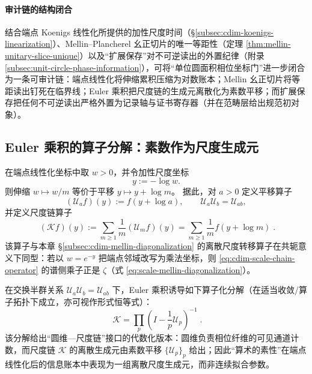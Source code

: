 \paragraph{审计链的结构闭合}
结合端点 Koenigs 线性化所提供的加性尺度时间（\S\ref{subsec:cdim-koenigs-linearization}）、Mellin--Plancherel 幺正切片的唯一等距性（定理 \ref{thm:mellin-unitary-slice-unique}）以及“扩展保存”对不可逆读出的外置纪律（附录 \ref{subsec:unit-circle-phase-information}），可将“单位圆面积相位坐标门”进一步闭合为一条可审计链：端点线性化将伸缩累积压缩为对数账本；Mellin 幺正切片将等距读出钉死在临界线；Euler 乘积把尺度链的生成元离散化为素数平移；而扩展保存把任何不可逆读出严格外置为记录轴与证书寄存器（并在范畴层给出规范初对象）。

\subsection{Euler 乘积的算子分解：素数作为尺度生成元}\label{subsec:cdim-euler-operator-factorization}
在端点线性化坐标中取 \(w>0\)，并令加性尺度坐标
\[
y:=-\log w.
\]
则伸缩 \(w\mapsto w/m\) 等价于平移 \(y\mapsto y+\log m\)。
据此，对 \(a>0\) 定义平移算子
\[
(\mathcal{U}_a f)(y):=f(y+\log a),
\qquad
\mathcal{U}_a\mathcal{U}_b=\mathcal{U}_{ab},
\]
并定义尺度链算子
\begin{equation}\label{eq:cdim-scale-chain-operator}
\boxed{\;
(\mathcal{K}f)(y)
:=\sum_{m\ge 1}\frac{1}{m}(\mathcal{U}_m f)(y)
=\sum_{m\ge 1}\frac{1}{m}f(y+\log m)\; }.
\end{equation}
该算子与本章 \S\ref{subsec:cdim-mellin-diagonalization} 的离散尺度转移算子在共轭意义下同型：若以 \(w=e^{-y}\) 把端点邻域改写为乘法坐标，则 \eqref{eq:cdim-scale-chain-operator} 的谱侧乘子正是 \(\zeta\)（式 \eqref{eq:scale-mellin-diagonalization}）。
\par
在交换半群关系 \(\mathcal{U}_a\mathcal{U}_b=\mathcal{U}_{ab}\) 下，Euler 乘积诱导如下算子化分解（在适当收敛/算子拓扑下成立，亦可视作形式恒等式）：
\begin{equation}\label{eq:cdim-euler-operator-factorization}
\boxed{\;
\mathcal{K}
=\prod_{p}\left(I-\frac{1}{p}\mathcal{U}_p\right)^{-1}\; }.
\end{equation}
该分解给出“圆维—尺度链”接口的代数化版本：圆维负责相位纤维的可见通道计数，而尺度链 \(\mathcal{K}\) 的离散生成元由素数平移 \(\{\mathcal{U}_p\}_p\) 给出；因此“算术的素性”在端点线性化后的信息账本中表现为一组离散尺度生成元，而非连续拟合参数。

